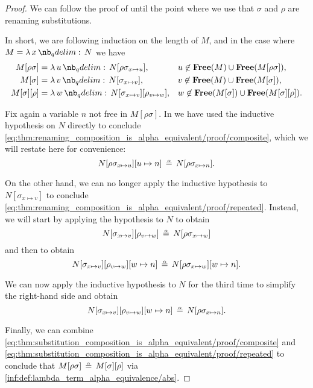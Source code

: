 \begin{proof}
  We can follow the proof of  until the point where we use that \( \sigma \) and \( \rho \) are renaming substitutions.

  In short, we are following induction on the length of \( M \), and in the case where \( M = \qabs x N \) we have
  \begin{align*}
    M[\rho\sigma]   &= \qabs u N[\rho\sigma_{x \mapsto u}],                 &&u \not\in \op*{Free}(M) \cup \op*{Free}(M[\rho\sigma]), \\
    M[\sigma]       &= \qabs v N[\sigma_{x \mapsto v}],                     &&v \not\in \op*{Free}(M) \cup \op*{Free}(M[\sigma]), \\
    M[\sigma][\rho] &= \qabs w N[\sigma_{x \mapsto v}][\rho_{v \mapsto w}], &&w \not\in \op*{Free}(M[\sigma]) \cup \op*{Free}(M[\sigma][\rho]).
  \end{align*}

  Fix again a variable \( n \) not free in \( M[\rho\sigma] \). In  we have used the inductive hypothesis on \( N \) directly to conclude \eqref{eq:thm:renaming_composition_is_alpha_equivalent/proof/composite}, which we will restate here for convenience:
  \begin{equation}\label{eq:thm:substitution_composition_is_alpha_equivalent/proof/composite}
    N[\rho\sigma_{x \mapsto u}][u \mapsto n] \aequiv N[\rho\sigma_{x \mapsto n}].
  \end{equation}

  On the other hand, we can no longer apply the inductive hypothesis to \( N[\sigma_{x \mapsto v}] \) to conclude \eqref{eq:thm:renaming_composition_is_alpha_equivalent/proof/repeated}. Instead, we will start by applying the hypothesis to \( N \) to obtain
  \begin{equation*}
    N[\sigma_{x \mapsto v}][\rho_{v \mapsto w}] \aequiv N[\rho\sigma_{x \mapsto w}]
  \end{equation*}
  and then  to obtain
  \begin{equation*}
    N[\sigma_{x \mapsto v}][\rho_{v \mapsto w}][w \mapsto n] \aequiv N[\rho\sigma_{x \mapsto w}][w \mapsto n].
  \end{equation*}

  We can now apply the inductive hypothesis to \( N \) for the third time to simplify the right-hand side and obtain
  \begin{equation}\label{eq:thm:substitution_composition_is_alpha_equivalent/proof/repeated}
    N[\sigma_{x \mapsto v}][\rho_{v \mapsto w}][w \mapsto n] \aequiv N[\rho\sigma_{x \mapsto n}].
  \end{equation}

  Finally, we can combine \eqref{eq:thm:substitution_composition_is_alpha_equivalent/proof/composite} and \eqref{eq:thm:substitution_composition_is_alpha_equivalent/proof/repeated} to conclude that \( M[\rho\sigma] \aequiv M[\sigma][\rho] \) via \ref{inf:def:lambda_term_alpha_equivalence/abs}.
\end{proof}

